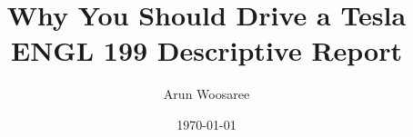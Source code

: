 \documentclass{article}
\title{Why You Should Drive a Tesla\\
\vspace{.25cm}\large ENGL 199 Descriptive Report \vspace{-.5cm}}
\author{\LARGE Arun Woosaree}
\date{\today}
\begin{document}
  \maketitle %

  \blindtext
  \cite{eberhard200621}
  \blindtext

  \blindtext\blindtext

  \blindtext\blindtext
  \blindtext\blindtext
  \blindtext\blindtext


\end{document}

